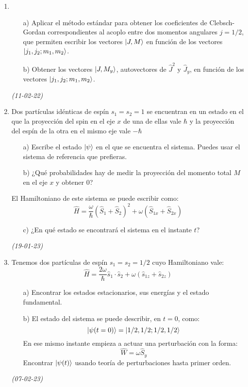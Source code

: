 \begin{enumerate}
    \item \begin{itemize}
        \item[a)] Aplicar el método estándar para obtener los coeficientes de Clebsch-Gordan correspondientes al acoplo entre dos momentos angulares \( j = 1/2 \), que permiten escribir los vectores \( \ket{J, M} \) en función de los vectores \( \ket{j_1, j_2; m_1, m_2} \).
        \item[b)] Obtener los vectores \( \ket{J, M_y} \), autovectores de \( \hat{J}^2 \) y \( \hat{J}_y \), en función de los vectores \( \ket{j_1, j_2; m_1, m_2} \). 
    \end{itemize} \textit{(11-02-22)}

    \item Dos partículas idénticas de espín \( s_1 = s_2 = 1 \) se encuentran en un estado en el que la proyección del spin en el eje \( x \) de una de ellas vale \( \hbar \) y la proyección del espín de la otra en el mismo eje vale \( -\hbar \)

    \begin{itemize}
        \item[a)] Escribe el estado \( \ket{\psi} \) en el que se encuentra el sistema. Puedes usar el sistema de referencia que prefieras.
        \item[b)] ¿Qué probabilidades hay de medir la proyección del momento total \( M \) en el eje \( x \) y obtener 0?
    \end{itemize}
    
    El Hamiltoniano de este sistema se puede escribir como:
    \[
    \hat{H} = \frac{\omega}{\hbar} \left( \hat{S}_1 + \hat{S}_2 \right)^2 + \omega \left( \hat{S}_{1x} + \hat{S}_{2x} \right)
    \]
    
    \begin{itemize}
        \item[c)] ¿En qué estado se encontrará el sistema en el instante \( t \)?
    \end{itemize} \textit{(19-01-23)}

    \item Tenemos dos partículas de espín \( s_1 = s_2 = 1/2 \) cuyo Hamiltoniano vale:
    \[
    \hat{H} = \frac{2 \omega}{\hbar} \hat{s}_1 \cdot \hat{s}_2 + \omega \left( \hat{s}_{1z} + \hat{s}_{2z} \right)
    \]
    \begin{itemize}
        \item[a)] Encontrar los estados estacionarios, sus energías y el estado fundamental.
        \item[b)] El estado del sistema se puede describir, en \( t = 0 \), como:
        \[
        \ket{\psi(t = 0)} = \ket{1/2, 1/2; 1/2, 1/2}
        \]
        En ese mismo instante empieza a actuar una perturbación con la forma:
        \[
        \hat{W} = \omega \hat{S}_y
        \]
        Encontrar \( \ket{\psi(t)} \) usando teoría de perturbaciones hasta primer orden.
    \end{itemize} \textit{(07-02-23)}


\end{enumerate}
